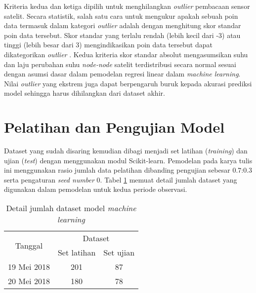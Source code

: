 Kriteria kedua dan ketiga dipilih untuk menghilangkan \textit{outlier}
pembacaan sensor satelit. Secara statistik, salah satu cara untuk mengukur
apakah sebuah poin data termasuk dalam kategori \textit{outlier} adalah dengan
menghitung skor standar poin data tersebut. Skor standar yang terlalu rendah
(lebih kecil dari -3) atau tinggi (lebih besar dari 3) mengindikasikan poin
data tersebut dapat dikategorikan \textit{outlier} \cite{boschetti2015}. Kedua
kriteria skor standar absolut mengasumsikan suhu dan laju perubahan suhu
\textit{node-node} satelit terdistribusi secara normal sesuai dengan asumsi
dasar dalam pemodelan regresi linear dalam \textit{machine learning}. Nilai
\textit{outlier} yang ekstrem juga dapat berpengaruh buruk kepada akurasi
prediksi model sehingga harus dihilangkan dari dataset akhir.

\section{Pelatihan dan Pengujian Model}

Dataset yang sudah disaring kemudian dibagi menjadi set latihan
(\textit{training}) dan ujian (\textit{test}) dengan menggunakan modul
Scikit-learn. Pemodelan pada karya tulis ini menggunakan rasio jumlah data
pelatihan dibanding pengujian sebesar 0.7:0.3 serta pengaturan \textit{seed
number} 0. Tabel \ref{table:dataset} memuat detail jumlah dataset yang
digunakan dalam pemodelan untuk kedua periode observasi.

\begin{table}[!ht]
\begin{center}
\caption{Detail jumlah dataset model \textit{machine learning}}
\label{table:dataset}
\begin{tabular}{|c|cc|}
\hline
\multirow{2}{*}{Tanggal} & \multicolumn{2}{c|}{Dataset}                 \\ \cline{2-3} 
                         & \multicolumn{1}{c|}{Set latihan} & Set ujian \\ \hline
19 Mei 2018              & \multicolumn{1}{c|}{201}         & 87        \\ \hline
20 Mei 2018              & \multicolumn{1}{c|}{180}         & 78        \\ \hline
\end{tabular}
\end{center}
\vspace{-5mm}
\end{table}
